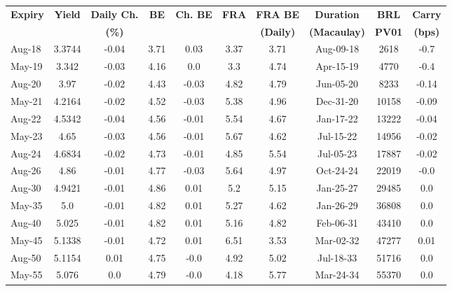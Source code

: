 \documentclass[article,crop=false]{standalone}%
\begin{document}
%
\normalsize%
\setlength{\tabcolsep}{0.15cm}%
\begin{tabular}[h]{l|c c|c c|c c|c c c}%
\hline%
\rowcolor{white}%
\textbf{Expiry}&\textbf{Yield}&\textbf{Daily Ch.}&\textbf{BE}&\textbf{Ch. BE}&\textbf{FRA}&\textbf{FRA BE}&\textbf{Duration}&\textbf{BRL}&\textbf{Carry}\\%
\rowcolor{white}%
\textbf{}&\textbf{}&\textbf{(\%)}&\textbf{}&\textbf{}&\textbf{}&\textbf{(Daily)}&\textbf{(Macaulay)}&\textbf{PV01}&\textbf{(bps)}\\%
\hline%
\rowcolor{lightgray}%
Aug{-}18&3.3744&{-}0.04&3.71&0.03&3.37&3.71&Aug{-}09{-}18&2618&{-}0.7\\%
\rowcolor{white}%
May{-}19&3.342&{-}0.03&4.16&0.0&3.3&4.74&Apr{-}15{-}19&4770&{-}0.4\\%
\rowcolor{lightgray}%
Aug{-}20&3.97&{-}0.02&4.43&{-}0.03&4.82&4.79&Jun{-}05{-}20&8233&{-}0.14\\%
\rowcolor{white}%
May{-}21&4.2164&{-}0.02&4.52&{-}0.03&5.38&4.96&Dec{-}31{-}20&10158&{-}0.09\\%
\rowcolor{lightgray}%
Aug{-}22&4.5342&{-}0.04&4.56&{-}0.01&5.54&4.67&Jan{-}17{-}22&13222&{-}0.04\\%
\rowcolor{white}%
May{-}23&4.65&{-}0.03&4.56&{-}0.01&5.67&4.62&Jul{-}15{-}22&14956&{-}0.02\\%
\rowcolor{lightgray}%
Aug{-}24&4.6834&{-}0.02&4.73&{-}0.01&4.85&5.54&Jul{-}05{-}23&17887&{-}0.02\\%
\rowcolor{white}%
Aug{-}26&4.86&{-}0.01&4.77&{-}0.03&5.64&4.97&Oct{-}24{-}24&22019&{-}0.0\\%
\rowcolor{lightgray}%
Aug{-}30&4.9421&{-}0.01&4.86&0.01&5.2&5.15&Jan{-}25{-}27&29485&0.0\\%
\rowcolor{white}%
May{-}35&5.0&{-}0.01&4.82&0.01&5.27&4.62&Jan{-}26{-}29&36808&0.0\\%
\rowcolor{lightgray}%
Aug{-}40&5.025&{-}0.01&4.82&0.01&5.16&4.82&Feb{-}06{-}31&43410&0.0\\%
\rowcolor{white}%
May{-}45&5.1338&{-}0.01&4.72&0.01&6.51&3.53&Mar{-}02{-}32&47277&0.01\\%
\rowcolor{lightgray}%
Aug{-}50&5.1154&0.01&4.75&{-}0.0&4.92&5.02&Jul{-}18{-}33&51716&0.0\\%
\rowcolor{white}%
May{-}55&5.076&0.0&4.79&{-}0.0&4.18&5.77&Mar{-}24{-}34&55370&0.0\\%
\hline%
\end{tabular}%
\end{document}
